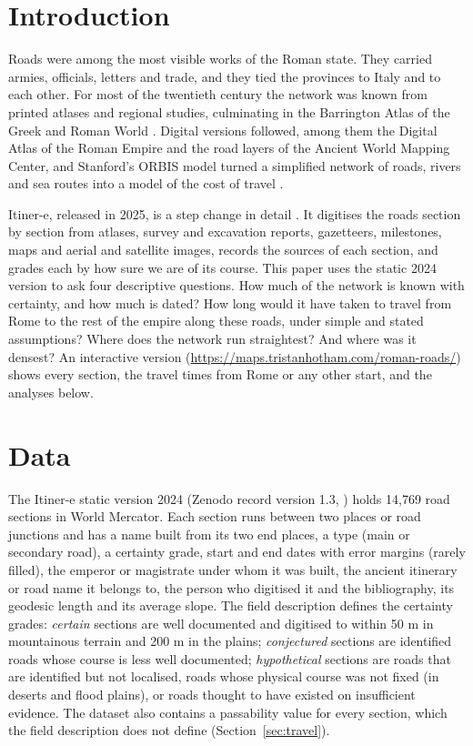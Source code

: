 \documentclass[11pt,a4paper]{article}
\begin{document}
\section{Introduction}
Roads were among the most visible works of the Roman state. They carried armies, officials, letters and trade, and they tied the provinces to Italy and to each other. For most of the twentieth century the network was known from printed atlases and regional studies, culminating in the Barrington Atlas of the Greek and Roman World \citep{talbert2000}. Digital versions followed, among them the Digital Atlas of the Roman Empire \citep{dare} and the road layers of the Ancient World Mapping Center, and Stanford's ORBIS model turned a simplified network of roads, rivers and sea routes into a model of the cost of travel \citep{orbis,scheidel2014}.

Itiner-e, released in 2025, is a step change in detail \citep{itinere,desoto2025}. It digitises the roads section by section from atlases, survey and excavation reports, gazetteers, milestones, maps and aerial and satellite images, records the sources of each section, and grades each by how sure we are of its course. This paper uses the static 2024 version to ask four descriptive questions. How much of the network is known with certainty, and how much is dated? How long would it have taken to travel from Rome to the rest of the empire along these roads, under simple and stated assumptions? Where does the network run straightest? And where was it densest? An interactive version (\url{https://maps.tristanhotham.com/roman-roads/}) shows every section, the travel times from Rome or any other start, and the analyses below.

\section{Data}
The Itiner-e static version 2024 (Zenodo record version 1.3, \citealp{itinere}) holds 14,769 road sections in World Mercator. Each section runs between two places or road junctions and has a name built from its two end places, a type (main or secondary road), a certainty grade, start and end dates with error margins (rarely filled), the emperor or magistrate under whom it was built, the ancient itinerary or road name it belongs to, the person who digitised it and the bibliography, its geodesic length and its average slope. The field description defines the certainty grades: \emph{certain} sections are well documented and digitised to within 50 m in mountainous terrain and 200 m in the plains; \emph{conjectured} sections are identified roads whose course is less well documented; \emph{hypothetical} sections are roads that are identified but not localised, roads whose physical course was not fixed (in deserts and flood plains), or roads thought to have existed on insufficient evidence. The dataset also contains a passability value for every section, which the field description does not define (Section~\ref{sec:travel}).
\end{document}
